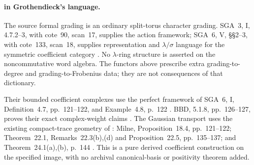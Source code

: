 \paragraph{ in Grothendieck's language.}
The source formal grading is an ordinary split-torus
character grading. SGA~3, I, 4.7.2--3, with cote~90,
scan~17, supplies the action framework; SGA~6, V,
\S\S2--3, with cote~133, scan~18, supplies representation
and \(\lambda/\sigma\) language for the symmetric
coefficient category \cite{SGA3,SGA6,Archive}.
No \(\lambda\)-ring structure is asserted on the
noncommutative word algebra.
The functors above prescribe extra grading-to-degree
and grading-to-Frobenius data; they are not consequences
of that dictionary.

Their bounded coefficient complexes use the perfect
framework of SGA~6, I, Definition~4.7, pp.~121--122,
and Example~4.8, p.~122 \cite{SGA6}.
BBD, 5.1.8, pp.~126--127, proves their exact
complex-weight claims \cite{BBD}.
The Gaussian transport uses the existing compact-trace
geometry of : Milne, Proposition~18.4,
pp.~121--122; Theorem~22.1, Remarks~22.3(b),(d) and
Proposition~22.5, pp.~135--137; and
Theorem~24.1(a),(b), p.~144 \cite{Milne}.
This is a pure derived coefficient construction on the
specified image, with no archival canonical-basis or
positivity theorem added.

